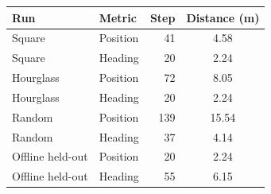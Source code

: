 \begin{tabular}{llrc}
\toprule
Run & Metric & Step & Distance (m) \\
\midrule
Square & Position & 41 & 4.58 \\
Square & Heading & 20 & 2.24 \\
Hourglass & Position & 72 & 8.05 \\
Hourglass & Heading & 20 & 2.24 \\
Random & Position & 139 & 15.54 \\
Random & Heading & 37 & 4.14 \\
Offline held-out & Position & 20 & 2.24 \\
Offline held-out & Heading & 55 & 6.15 \\
\bottomrule
\end{tabular}
